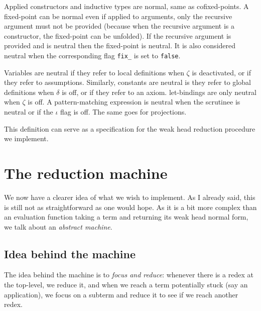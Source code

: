 Applied constructors and inductive types are normal, same as cofixed-points.
A fixed-point can be normal even if applied to arguments, only the recursive
argument must not be provided (because when the recursive argument is a
constructor, the fixed-point can be unfolded).
If the recursive argument is provided and is neutral then the fixed-point is
neutral.
It is also considered neutral when the corresponding flag \texttt{fix_}
is set to \texttt{false}.

Variables are neutral if they refer to local definitions when \(\zeta\) is
deactivated, or if they refer to assumptions.
Similarly, constants are neutral is they refer to global definitions when
\(\delta\) is off, or if they refer to an axiom.
let-bindings are only neutral when \(\zeta\) is off.
A pattern-matching expression is neutral when the scrutinee is neutral or if the
\(\iota\) flag is off. The same goes for projections.

This definition can serve as a specification for the weak head reduction
procedure we implement.

\section{The reduction machine}

We now have a clearer idea of what we wish to implement. As I already said, this
is still not as straightforward as one would hope.
As it is a bit more complex than an evaluation function taking a term and
returning its weak head normal form, we talk about an \emph{abstract machine}.

\subsection{Idea behind the machine}

The idea behind the machine is to \emph{focus and reduce}: whenever there is
a redex at the top-level, we reduce it, and when we reach a term potentially
stuck (say an application), we focus on a subterm and reduce it to see if we
reach another redex.

